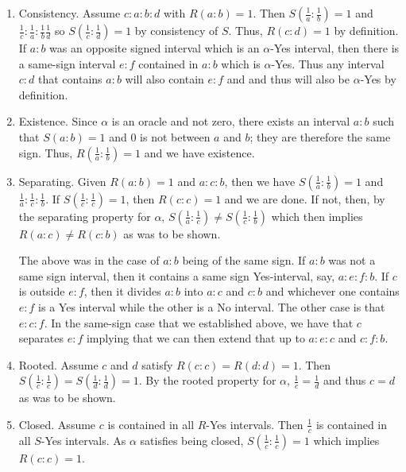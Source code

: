 \documentclass[12pt]{article}
\begin{document}
\begin{itemize}
    \begin{enumerate}
        \item Consistency. Assume $c: a: b: d $ with $R(a:b)=1$. Then $S(\frac{1}{a}:\frac{1}{b}) = 1$ and $\frac{1}{c}:\frac{1}{a}:\frac{1}{b}\frac{1}{d}$ so $S(\frac{1}{c}:\frac{1}{d})=1$ by consistency of $S$. Thus, $R(c:d) = 1$ by definition. If $a:b$ was an opposite signed interval which is an $\alpha$-Yes interval, then there is a same-sign interval $e:f$ contained in $a:b$ which is $\alpha$-Yes. Thus any interval $c:d$ that contains $a:b$ will also contain $e:f$ and and thus will also be $\alpha$-Yes by definition. 
        \item Existence. Since $\alpha$ is an oracle and not zero, there exists an interval $a:b$ such that $S(a:b)=1$ and 0 is not between $a$ and $b$; they are therefore the same sign. Thus, $R(\frac{1}{a}:\frac{1}{b})=1$ and we have existence. 
        \item Separating. Given $R(a:b)=1$ and $a:c:b$, then we have $S(\frac{1}{a}:\frac{1}{b})=1$ and $\frac{1}{a}:\frac{1}{c}:\frac{1}{b}$. If $S(\frac{1}{c}:\frac{1}{c})=1$, then $R(c:c)=1$ and we are done. If not, then, by the separating property for $\alpha$,  $S(\frac{1}{a}:\frac{1}{c}) \neq S(\frac{1}{c}:\frac{1}{b})$ which then implies $R(a:c)\neq R(c:b)$ as was to be shown. 
        
        The above was in the case of $a:b$ being of the same sign. If $a:b$ was not a same sign interval, then it contains a same sign Yes-interval, say, $a:e:f:b$. If $c$ is outside $e:f$, then it divides $a:b$ into $a:c$ and $c:b$ and whichever one contains $e:f$ is a Yes interval while the other is a No interval. The other case is that $e:c:f$. In the same-sign case that we established above, we have that $c$ separates $e:f$ implying that we can then extend that up to $a:e:c$ and $c:f:b$.
        \item Rooted. Assume $c$ and $d$ satisfy $R(c:c)=R(d:d)=1$. Then $S(\frac{1}{c}:\frac{1}{c})=S(\frac{1}{d}:\frac{1}{d})=1$. By the rooted property for $\alpha$, $\frac{1}{c} = \frac{1}{d}$ and thus $c=d$ as was to be shown. 
        \item Closed. Assume $c$ is contained in all $R$-Yes intervals. Then $\frac{1}{c}$ is contained in all $S$-Yes intervals. As $\alpha$ satisfies being closed, $S(\frac{1}{c}:\frac{1}{c})=1$ which implies $R(c:c)=1$.
    \end{enumerate}
    

\end{itemize}
\end{document}
